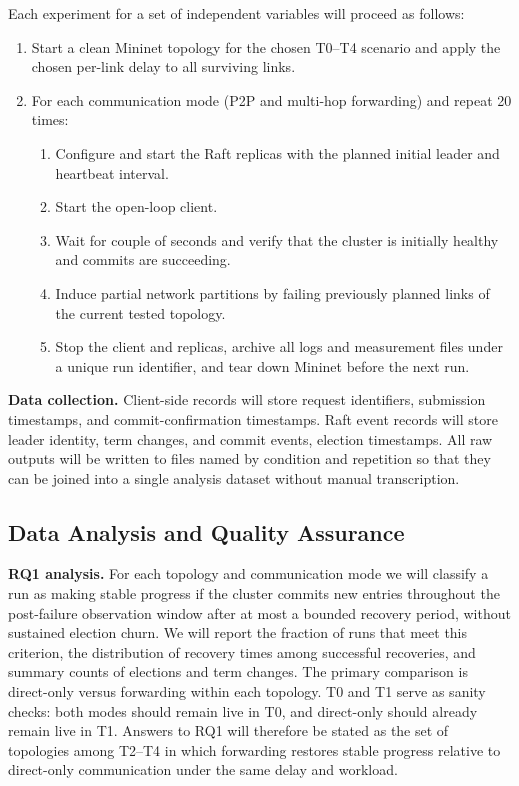 \documentclass[11pt,a4paper]{article}
\begin{document}
Each experiment for a set of independent variables will proceed as follows:
\begin{enumerate}
  \item Start a clean Mininet topology for the chosen T0--T4 scenario and apply the chosen per-link delay to all surviving links.
  \item For each communication mode (P2P and multi-hop forwarding) and repeat 20 times:
  \begin{enumerate}
    \item Configure and start the Raft replicas with the planned initial leader and heartbeat interval.
    \item Start the open-loop client.
    \item Wait for couple of seconds and verify that the cluster is initially healthy and commits are succeeding.
    \item Induce partial network partitions by failing previously planned links of the current tested topology.
    \item Stop the client and replicas, archive all logs and measurement files under a unique run identifier, and tear down Mininet before the next run.
  \end{enumerate}
\end{enumerate}

\textbf{Data collection.}
Client-side records will store request identifiers, submission timestamps, and commit-confirmation timestamps.
Raft event records will store leader identity, term changes, and commit events, election timestamps.
All raw outputs will be written to files named by condition and repetition so that they can be joined into a single analysis dataset without manual transcription.

\subsection{Data Analysis and Quality Assurance}

\textbf{RQ1 analysis.}
For each topology and communication mode we will classify a run as making stable progress if the cluster commits new entries throughout the post-failure observation window after at most a bounded recovery period, without sustained election churn.
We will report the fraction of runs that meet this criterion, the distribution of recovery times among successful recoveries, and summary counts of elections and term changes.
The primary comparison is direct-only versus forwarding within each topology.
T0 and T1 serve as sanity checks: both modes should remain live in T0, and direct-only should already remain live in T1.
Answers to RQ1 will therefore be stated as the set of topologies among T2--T4 in which forwarding restores stable progress relative to direct-only communication under the same delay and workload.
\end{document}
